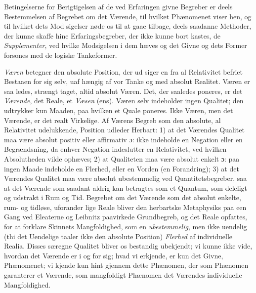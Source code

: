 \documentclass[12pt,a4paper]{book}
\begin{document}
Betingelserne for Berigtigelsen af de ved Erfaringen givne
Begreber er deels Bestemmelsen af Begrebet om det Værende,
til hvilket Phænomenet viser hen, og til hvilket dets Mod\-%
sigelser nøde os til at gaae tilbage, deels saadanne Methoder,
der kunne skaffe hine Erfaringsbegreber, der ikke kunne bort\-%
kastes, de \emph{Supplementer}, ved hvilke Modsigelsen i dem hæves
og det Givne og dets Former forsones med de logiske Tankeformer.

\emph{Væren} betegner den absolute Position, der ud\-%
siger en fra al Relativitet befriet Bestaaen for sig selv, uaf\-%
hængig af vor Tanke og med absolut Realitet. Væren er saa\-%
ledes, strængt taget, altid absolut Væren. Det, der saaledes
poneres, er det \emph{Værende}, det Reale, et \emph{Væsen} (ens). Væren
selv indeholder ingen Qualitet; den udtrykker kun Maaden,
paa hvilken et Quale poneres. Ikke Væren, men det Værende,
er det realt Virkelige. Af Værens Begreb som den absolute,
al Relativitet udelukkende, Position udleder Herbart: 1) at det
Værendes Qualitet maa være absolut positiv eller affirmativ
ɔ: ikke indeholde en Negation eller en Begrændsning,
da enhver Negation indeslutter en Relativitet, ved hvilken
Absolutheden vilde ophæves; 2) at Qualiteten maa være absolut
enkelt ɔ: paa ingen Maade indeholde en Flerhed, eller en
Vorden (en Forandring); 3) at det Værendes Qualitet maa være
absolut ubestemmelig ved Quantitetsbegreber, saa at det
Værende som saadant aldrig kan betragtes som et Quantum,
som deleligt og udstrakt i Rum og Tid. Begrebet om det
Værende som det absolut enkelte, rum- og tidløse, uforander\-%
lige Reale bliver den herbartske Metaphysiks paa een Gang
ved Eleaterne og Leibnitz paavirkede Grundbegreb, og det
Reale opfattes, for at forklare Skinnets Mangfoldighed, som
en \emph{ubestemmelig}, men ikke uendelig (thi det Uendelige
taaler ikke den absolute Position) \emph{Flerhed} af individuelle
Realia. Disses særegne Qualitet bliver os bestandig ubekjendt;
vi kunne ikke vide, hvordan det Værende er i og for sig;
hvad vi erkjende, er kun det Givne, Phænomenet; vi kjende
kun hint gjennem dette Phænomen, der som Phænomen
garanterer et Værende, som mangfoldigt Phænomen det
Værendes individuelle Mangfoldighed.
\end{document}
